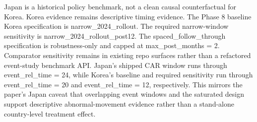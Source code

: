Japan is a historical policy benchmark, not a clean causal counterfactual for Korea.
Korea evidence remains descriptive timing evidence.
The Phase 8 baseline Korea specification is narrow_2024_rollout.
The required narrow-window sensitivity is narrow_2024_rollout_post12.
The spaced_follow_through specification is robustness-only and capped at max_post_months = 2.
Comparator sensitivity remains in existing repo surfaces rather than a refactored event-study benchmark API.
Japan's shipped CAR window runs through event_rel_time = 24, while Korea's baseline and required sensitivity run through event_rel_time = 20 and event_rel_time = 12, respectively.
This mirrors the paper's Japan caveat that overlapping event windows and the saturated design support descriptive abnormal-movement evidence rather than a stand-alone country-level treatment effect.

